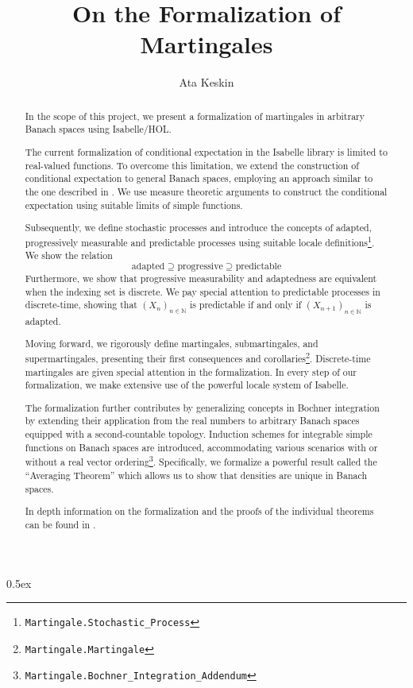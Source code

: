 ﻿\documentclass[11pt,a4paper]{article}
\begin{document}
\title{On the Formalization of Martingales}
\author{Ata Keskin}
\maketitle
\begin{abstract}
In the scope of this project, we present a formalization of martingales in arbitrary Banach spaces using Isabelle/HOL.

The current formalization of conditional expectation in the Isabelle library is limited to real-valued functions. To overcome this limitation, we extend the construction of conditional expectation to general Banach spaces, employing an approach similar to the one described in \cite{Hytoenen_2016}. We use measure theoretic arguments to construct the conditional expectation using suitable limits of simple functions.

Subsequently, we define stochastic processes and introduce the concepts of adapted, progressively measurable and predictable processes using suitable locale definitions\footnote{\texttt{Martingale.Stochastic\_Process}}. We show the relation
\[
	\text{adapted} \supseteq \text{progressive} \supseteq \text{predictable}
\]
Furthermore, we show that progressive measurability and adaptedness are equivalent when the indexing set is discrete.
We pay special attention to predictable processes in discrete-time, showing that $(X_n)_{n \in \mathbb{N}}$ is predictable if and only if $(X_{n + 1})_{n \in \mathbb{N}}$ is adapted.

Moving forward, we rigorously define martingales, submartingales, and supermartingales, presenting their first consequences and corollaries\footnote{\texttt{Martingale.Martingale}}. Discrete-time martingales are given special attention in the formalization. In every step of our formalization, we make extensive use of the powerful locale system of Isabelle.

The formalization further contributes by generalizing concepts in Bochner integration by extending their application from the real numbers to arbitrary Banach spaces equipped with a second-countable topology. Induction schemes for integrable simple functions on Banach spaces are introduced, accommodating various scenarios with or without a real vector ordering\footnote{\texttt{Martingale.Bochner\_Integration\_Addendum}}. Specifically, we formalize a powerful result called the ``Averaging Theorem''\cite{Lang_1993} which allows us to show that densities are unique in Banach spaces.

In depth information on the formalization and the proofs of the individual theorems can be found in \cite{keskin2023formalization}.
\end{abstract}
\tableofcontents
\pagebreak

\parindent 0pt\parskip 0.5ex





\end{document}
